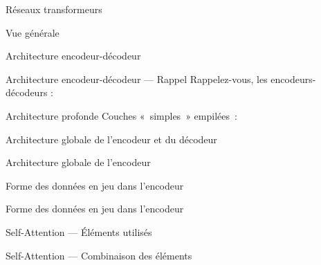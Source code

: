 \begin{frame}{Réseaux transformeurs}
\end{frame}

\begin{frame}{Vue générale}
\end{frame}

\begin{frame}{Architecture encodeur-décodeur}
\end{frame}

\begin{frame}{Architecture encodeur-décodeur --- Rappel}
  Rappelez-vous, les encodeurs-décodeurs :
\end{frame}

\begin{frame}{Architecture profonde}
  Couches «~simples~» empilées~:
\end{frame}

\begin{frame}{Architecture globale de l'encodeur et du décodeur}
\end{frame}

\begin{frame}{Architecture globale de l'encodeur}
\end{frame}

\begin{frame}{Forme des données en jeu dans l'encodeur}
\end{frame}

\begin{frame}{Forme des données en jeu dans l'encodeur}
\end{frame}

\begin{frame}{Self-Attention --- Éléments utilisés}
\end{frame}

\begin{frame}{Self-Attention --- Combinaison des éléments}
\end{frame}

